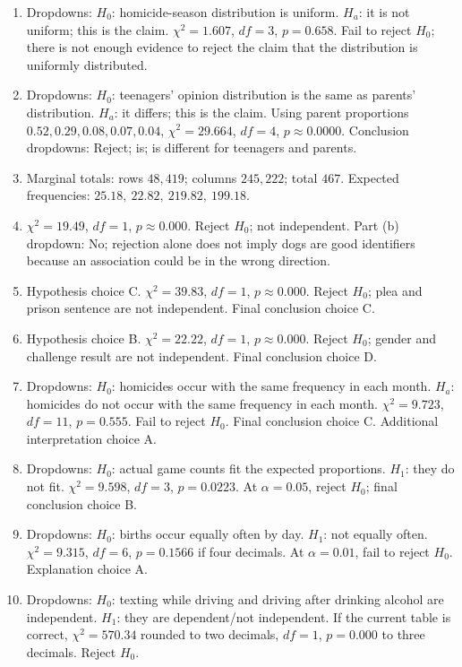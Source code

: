 \documentclass[11pt]{article}
\begin{document}
\begin{enumerate}[leftmargin=*]
\item Dropdowns: \(H_0\): homicide-season distribution is uniform. \(H_a\): it is not uniform; this is the claim. \(\chi^2=1.607\), \(df=3\), \(p=0.658\). Fail to reject \(H_0\); there is not enough evidence to reject the claim that the distribution is uniformly distributed.
\item Dropdowns: \(H_0\): teenagers' opinion distribution is the same as parents' distribution. \(H_a\): it differs; this is the claim. Using parent proportions \(0.52,0.29,0.08,0.07,0.04\), \(\chi^2=29.664\), \(df=4\), \(p\approx0.0000\). Conclusion dropdowns: Reject; is; is different for teenagers and parents.
\item Marginal totals: rows \(48,419\); columns \(245,222\); total \(467\). Expected frequencies: \(25.18,\ 22.82,\ 219.82,\ 199.18\).
\item \(\chi^2=19.49\), \(df=1\), \(p\approx0.000\). Reject \(H_0\); not independent. Part (b) dropdown: No; rejection alone does not imply dogs are good identifiers because an association could be in the wrong direction.
\item Hypothesis choice C. \(\chi^2=39.83\), \(df=1\), \(p\approx0.000\). Reject \(H_0\); plea and prison sentence are not independent. Final conclusion choice C.
\item Hypothesis choice B. \(\chi^2=22.22\), \(df=1\), \(p\approx0.000\). Reject \(H_0\); gender and challenge result are not independent. Final conclusion choice D.
\item Dropdowns: \(H_0\): homicides occur with the same frequency in each month. \(H_a\): homicides do not occur with the same frequency in each month. \(\chi^2=9.723\), \(df=11\), \(p=0.555\). Fail to reject \(H_0\). Final conclusion choice C. Additional interpretation choice A.
\item Dropdowns: \(H_0\): actual game counts fit the expected proportions. \(H_1\): they do not fit. \(\chi^2=9.598\), \(df=3\), \(p=0.0223\). At \(\alpha=0.05\), reject \(H_0\); final conclusion choice B.
\item Dropdowns: \(H_0\): births occur equally often by day. \(H_1\): not equally often. \(\chi^2=9.315\), \(df=6\), \(p=0.1566\) if four decimals. At \(\alpha=0.01\), fail to reject \(H_0\). Explanation choice A.
\item Dropdowns: \(H_0\): texting while driving and driving after drinking alcohol are independent. \(H_1\): they are dependent/not independent. If the current table is correct, \(\chi^2=570.34\) rounded to two decimals, \(df=1\), \(p=0.000\) to three decimals. Reject \(H_0\).
\end{enumerate}
\end{document}
